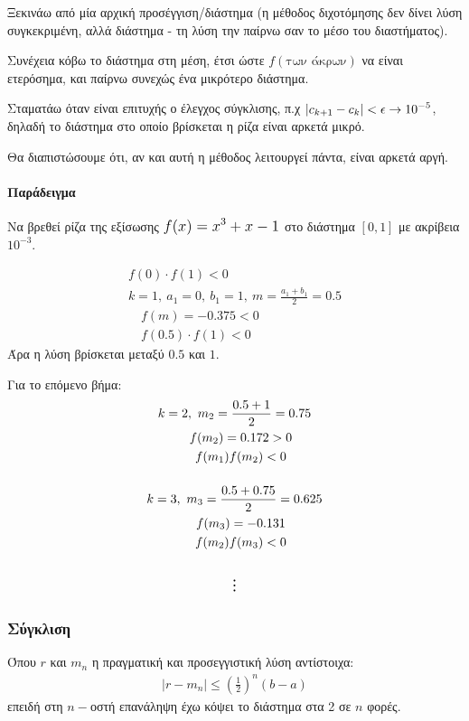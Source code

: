 \documentclass[11pt,a4paper,notitlepage,fleqn]{article}
\begin{document}
	Ξεκινάω από μία αρχική προσέγγιση/διάστημα (η μέθοδος διχοτόμησης δεν δίνει λύση
	συγκεκριμένη, αλλά διάστημα - τη λύση την παίρνω σαν το μέσο του διαστήματος).
	
	Συνέχεια κόβω το διάστημα στη μέση, έτσι ώστε \( f(\text{των άκρων}) \) να είναι
	ετερόσημα, και παίρνω συνεχώς ένα μικρότερο διάστημα.
	
	Σταματάω όταν είναι επιτυχής ο έλεγχος σύγκλισης, π.χ
	\( \mathlarger{\left|c_{k+1}-c_k\right| < \epsilon \rightarrow 10^{-5}} \), δηλαδή
	το διάστημα στο οποίο βρίσκεται η ρίζα είναι αρκετά μικρό.
	
	Θα διαπιστώσουμε ότι, αν και αυτή η μέθοδος λειτουργεί πάντα, είναι αρκετά αργή.
	
	\paragraph{Παράδειγμα}
	Να βρεθεί ρίζα της εξίσωσης
	\( \mathlarger{
	\mathlarger{f(x) = x^3+x-1} }
	 \) στο διάστημα \( [0,1] \) με ακρίβεια \( 10^{-3} \).
	
	\begin{gather*}
		f(0) \cdot f(1) < 0 \\
		k=1,\ a_1=0,\ b_1=1,\ m=\frac{a_1+b_1}{2} = 0.5 \\
		\quad f(m) = -0.375 < 0 \\
		\quad f(0.5) \cdot f(1) < 0
	\end{gather*}
	Άρα η λύση βρίσκεται μεταξύ \( 0.5 \) και \( 1 \).
	
	Για το επόμενο βήμα:
	\begin{gather*}
		k = 2,\ m_2 = \frac{0.5+1}{2} = 0.75 \\
		\quad f(m_2) = 0.172 > 0 \\
		\quad f(m_1)f(m_2) < 0 \\[3ex]
		k=3,\ m_3 = \frac{0.5+0.75}{2} = 0.625 \\
		\quad f(m_3) = -0.131 \\
		\quad f(m_2)f(m_3) < 0 \\[3ex]
		\mathlarger{\mathlarger{\vdots}}
	\end{gather*}
	
	\subsubsection{Σύγκλιση}
	Όπου \( r \) και \( m_n \) η πραγματική και προσεγγιστική λύση αντίστοιχα:
	\begin{align*}
		\left|r - m_n\right| \leq \left(\frac{1}{2}\right)^n (b-a)
	\end{align*}
	επειδή στη \( n- \)οστή επανάληψη έχω κόψει το διάστημα στα 2 σε \( n \) φορές.
	
\end{document}
